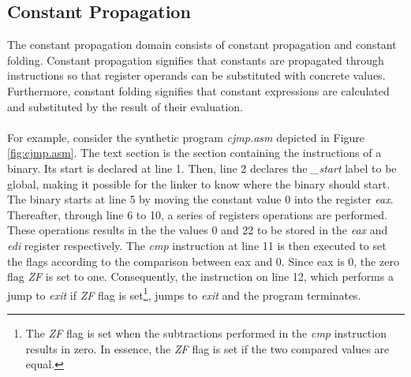 \documentclass{kththesis}
\newcommand{\fbcomment}[1]{{#1}}
\renewcommand{\fbcomment}[1]{}
\renewcommand{\it}[1]{\textit{#1}}
\begin{document}
\subsection{Constant Propagation}\label{sec:absDomCon}
\fbcomment{\color{red}Goal: Introduce constant propagation and show a basic example of how it is used.}
The constant propagation domain consists of constant propagation and constant folding. Constant propagation signifies that constants are propagated through instructions so that register operands can be substituted with concrete values. Furthermore, constant folding signifies that constant expressions are calculated and substituted by the result of their evaluation.
\\ \\
For example, consider the synthetic program \it{cjmp.asm} depicted in Figure \ref{fig:cjmp.asm}. The text section is the section containing the instructions of a binary. Its start is declared at line 1. Then, line 2 declares the \it{\_start} label to be global, making it possible for the linker to know where the binary should start. The binary starts at line 5 by moving the constant value 0 into the register \it{eax}. Thereafter, through line 6 to 10, a series of registers operations are performed. These operations results in the the values 0 and 22 to be stored in the \it{eax} and \it{edi} register respectively. The \it{cmp} instruction at line 11 is then executed to set the flags according to the comparison between eax and 0. Since eax is 0, the zero flag \it{ZF} is set to one. Consequently, the instruction on line 12, which performs a jump to \it{exit} if \it{ZF} flag is set\footnote{The \it{ZF} flag is set when the subtractions performed in the \it{cmp} instruction results in zero. In essence, the \it{ZF} flag is set if the two compared values are equal.}, jumps to \it{exit} and the program terminates. 
\end{document}
